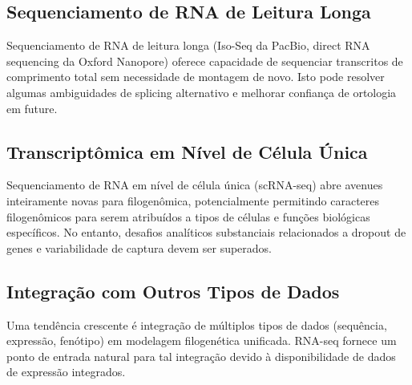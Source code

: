 \subsection{Sequenciamento de RNA de Leitura Longa}

Sequenciamento de RNA de leitura longa (Iso-Seq da PacBio, direct RNA sequencing da Oxford Nanopore) oferece capacidade de sequenciar transcritos de comprimento total sem necessidade de montagem de novo. Isto pode resolver algumas ambiguidades de splicing alternativo e melhorar confiança de ortologia em future.

\subsection{Transcriptômica em Nível de Célula Única}

Sequenciamento de RNA em nível de célula única (scRNA-seq) abre avenues inteiramente novas para filogenômica, potencialmente permitindo caracteres filogenômicos para serem atribuídos a tipos de células e funções biológicas específicos. No entanto, desafios analíticos substanciais relacionados a dropout de genes e variabilidade de captura devem ser superados.

\subsection{Integração com Outros Tipos de Dados}

Uma tendência crescente é integração de múltiplos tipos de dados (sequência, expressão, fenótipo) em modelagem filogenética unificada. RNA-seq fornece um ponto de entrada natural para tal integração devido à disponibilidade de dados de expressão integrados.


